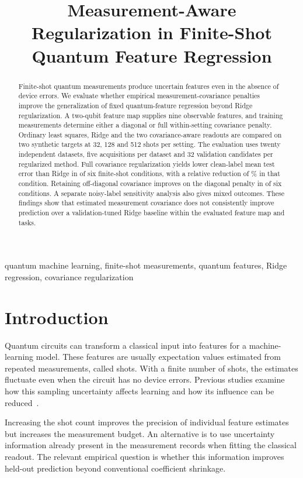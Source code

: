 \documentclass[conference]{IEEEtran}
\title{Measurement-Aware Regularization in Finite-Shot Quantum Feature Regression}
\author{\IEEEauthorblockN{Kartik Mehra}
\IEEEauthorblockA{kartik.mehra2024@nst.rishihood.edu.in}
\and
\IEEEauthorblockN{Viraj Chafale}
\IEEEauthorblockA{viraj.chafale2024@nst.rishihood.edu.in}}
\begin{document}
\maketitle

\begin{abstract}
Finite-shot quantum measurements produce uncertain features even in the absence of device errors. We evaluate whether empirical measurement-covariance penalties improve the generalization of fixed quantum-feature regression beyond Ridge regularization. A two-qubit feature map supplies nine observable features, and training measurements determine either a diagonal or full within-setting covariance penalty. Ordinary least squares, Ridge and the two covariance-aware readouts are compared on two synthetic targets at 32, 128 and 512 shots per setting. The evaluation uses twenty independent datasets, five acquisitions per dataset and 32 validation candidates per regularized method. Full covariance regularization yields lower clean-label mean test error than Ridge in \CleanWins{} of six finite-shot conditions, with a relative reduction of \BestReduction{}\% in that condition. Retaining off-diagonal covariance improves on the diagonal penalty in \AblationWins{} of six conditions. A separate noisy-label sensitivity analysis also gives mixed outcomes. These findings show that estimated measurement covariance does not consistently improve prediction over a validation-tuned Ridge baseline within the evaluated feature map and tasks.
\end{abstract}

\begin{IEEEkeywords}
quantum machine learning, finite-shot measurements, quantum features, Ridge regression, covariance regularization
\end{IEEEkeywords}

\section{Introduction}
Quantum circuits can transform a classical input into features for a machine-learning model. These features are usually expectation values estimated from repeated measurements, called shots. With a finite number of shots, the estimates fluctuate even when the circuit has no device errors. Previous studies examine how this sampling uncertainty affects learning and how its influence can be reduced~\cite{kreplin,hu2023}.

Increasing the shot count improves the precision of individual feature estimates but increases the measurement budget. An alternative is to use uncertainty information already present in the measurement records when fitting the classical readout. The relevant empirical question is whether this information improves held-out prediction beyond conventional coefficient shrinkage.
\end{document}
